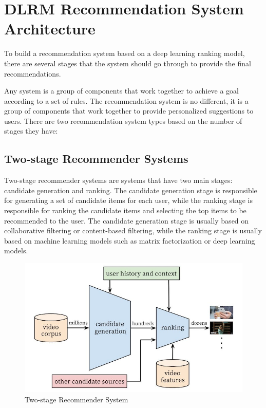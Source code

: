 

\section{DLRM Recommendation System Architecture}

To build a recommendation system based on a deep learning ranking model, there are several stages that the system should go through to provide the final recommendations.

Any system is a group of components that work together to achieve a goal according to a set of rules. The recommendation system is no different, it is a group of components that work together to provide personalized suggestions to users. There are two recommendation system types based on the number of stages they have:
\subsection{Two-stage Recommender Systems}
Two-stage recommender systems are systems that have two main stages: candidate generation and ranking. The candidate generation stage is responsible for generating a set of candidate items for each user, while the ranking stage is responsible for ranking the candidate items and selecting the top items to be recommended to the user. The candidate generation stage is usually based on collaborative filtering or content-based filtering, while the ranking stage is usually based on machine learning models such as matrix factorization or deep learning models.\cite{MultiStageRecSys}
\begin{figure}[H]
    \centering
    \includegraphics[width=1\textwidth]{assets/Two_stage_rec_sys.jpg}
    \caption[Two-stage Recommender System]{Two-stage Recommender System\cite{MultiStageRecSys}}
\end{figure}
